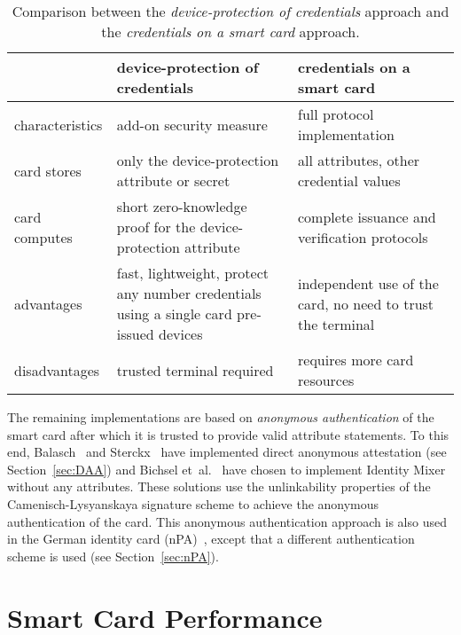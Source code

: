 \begin{table}
  \centering
  \caption{Comparison between the \emph{device-protection of credentials}
    approach and the \emph{credentials on a smart card} approach.}
  \label{tbl:approaches}
  \renewcommand{\tabcolsep}{1.25mm}
  \renewcommand{\arraystretch}{1.25}
  \begin{tabular}{l|p{47mm}|p{47mm}|}
     & device-protection of credentials & credentials on a smart card \\\hline
    characteristics &
      add-on security measure &
      full protocol implementation \\\hline
    card stores &
      only the device-protection attribute or secret &
      all attributes, other credential values \\\hline
    card computes &
      short zero-knowledge proof for the device-protection attribute &
      complete issuance and verification protocols \\\hline
    advantages &
      fast, lightweight, protect any number credentials
        using a single card pre-issued devices &
      independent use of the card, no need to trust the terminal \\\hline
    disadvantages &
      trusted terminal required &
      requires more card resources \\\hline
  \end{tabular}
\end{table}

The remaining implementations are based on \emph{anonymous authentication} of
the smart card after which it is trusted to provide valid attribute statements.
To this end, Balasch~\cite{Balasch2008} and Sterckx~\cite{Sterckx09} have
implemented direct anonymous attestation (see Section~\ref{sec:DAA}) and
Bichsel et~al.~\cite{BichselCGS2009} have chosen to implement Identity Mixer
without any attributes. These solutions use the unlinkability properties of the
Camenisch-Lysyanskaya signature scheme to achieve the anonymous authentication
of the card. This anonymous authentication approach is also used in the German 
identity card (nPA)~\cite{Kugler2010}, except that
a different authentication scheme is used (see Section~\ref{sec:nPA}).

\section{Smart Card Performance\label{sec:perf-comparison}}

